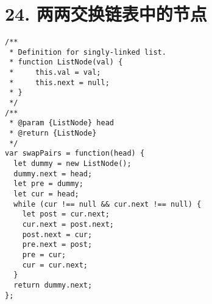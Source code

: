 \newpage
\section{24. 两两交换链表中的节点}
\label{leetcode:24}

\begin{verbatim}
/**
 * Definition for singly-linked list.
 * function ListNode(val) {
 *     this.val = val;
 *     this.next = null;
 * }
 */
/**
 * @param {ListNode} head
 * @return {ListNode}
 */
var swapPairs = function(head) {
  let dummy = new ListNode();
  dummy.next = head;
  let pre = dummy;
  let cur = head;
  while (cur !== null && cur.next !== null) {
    let post = cur.next;
    cur.next = post.next;
    post.next = cur;
    pre.next = post;
    pre = cur;
    cur = cur.next;
  }
  return dummy.next;
};
\end{verbatim}
